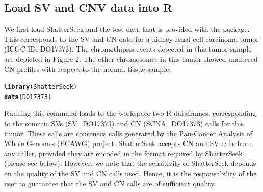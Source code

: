 \documentclass[twoside,a4wide,11pt]{article}\usepackage[]{graphicx}\usepackage[]{color}
\makeatletter
\newcommand{\hlstd}[1]{\textcolor[rgb]{0.345,0.345,0.345}{#1}}%
\newcommand{\hlkwd}[1]{\textcolor[rgb]{0.737,0.353,0.396}{\textbf{#1}}}%
\newenvironment{kframe}{%
 \def\at@end@of@kframe{}%
 \ifinner\ifhmode%
  \def\at@end@of@kframe{\end{minipage}}%
  \begin{minipage}{\columnwidth}%
 \fi\fi%
 \def\FrameCommand##1{\hskip\@totalleftmargin \hskip-\fboxsep
 \colorbox{shadecolor}{##1}\hskip-\fboxsep
     \hskip-\linewidth \hskip-\@totalleftmargin \hskip\columnwidth}%
 \MakeFramed {\advance\hsize-\width
   \@totalleftmargin\z@ \linewidth\hsize
   \@setminipage}}%
 {\par\unskip\endMakeFramed%
 \at@end@of@kframe}
\newenvironment{knitrout}{}{} %
\makeatother
\begin{document}

\subsection{Load SV and CNV data into R}


We first load ShatterSeek and the test data that is provided with the package.
This corresponds to the SV and CN data for a kidney renal cell carcinoma tumor (ICGC ID: DO17373).
The chromothipsis events detected in this tumor sample are depicted in Figure 2. The other
chromosomes in this tumor showed unaltered CN profiles with respect to the normal tissue sample.

\begin{knitrout}
\color{fgcolor}\begin{kframe}
\begin{alltt}
\hlkwd{library}\hlstd{(ShatterSeek)}
\hlkwd{data}\hlstd{(DO17373)}
\end{alltt}
\end{kframe}
\end{knitrout}
Running this command loads to the workspace two R dataframes, corresponding to the somatic SVs (SV\_DO17373)
and CN (SCNA\_DO17373) calls for this tumor.
These calls are consensus calls generated by the Pan-Cancer Analysis of Whole Genomes (PCAWG) project.
ShatterSeek accepts CN and SV calls from any caller, 
provided they are encoded in the format required by ShatterSeek (please see below).
However, we note that the sensitivity of ShatterSeek depends on the quality of the SV and CN calls used.
Hence, it is the responsability of the user to guarantee that the SV and CN calls are of sufficient quality.
\end{document}
